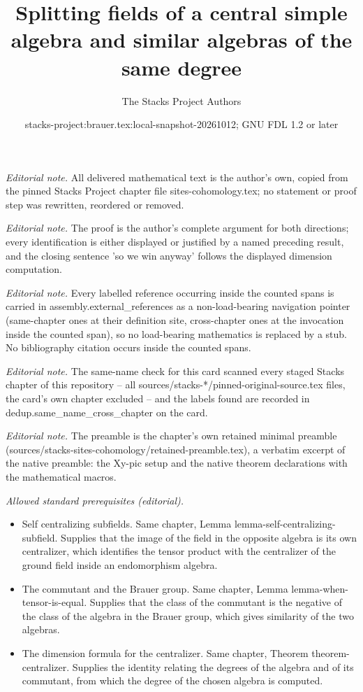 \documentclass[10pt,a4paper]{amsart}
\title{Splitting fields of a central simple algebra and similar algebras of the same degree}
\author{The Stacks Project Authors}
\date{stacks-project:brauer.tex:local-snapshot-20261012; GNU FDL 1.2 or later}
\theoremstyle{plain}
\theoremstyle{definition}
\theoremstyle{remark}
\numberwithin{equation}{subsection}
\begin{document}
\maketitle
\noindent\textit{Editorial note.} All delivered mathematical text is the author's own, copied from the pinned Stacks Project chapter file sites-cohomology.tex; no statement or proof step was rewritten, reordered or removed.\par\medskip
\noindent\textit{Editorial note.} The proof is the author's complete argument for both directions; every identification is either displayed or justified by a named preceding result, and the closing sentence 'so we win anyway' follows the displayed dimension computation.\par\medskip
\noindent\textit{Editorial note.} Every labelled reference occurring inside the counted spans is carried in assembly.external\_references as a non-load-bearing navigation pointer (same-chapter ones at their definition site, cross-chapter ones at the invocation inside the counted span), so no load-bearing mathematics is replaced by a stub. No bibliography citation occurs inside the counted spans.\par\medskip
\noindent\textit{Editorial note.} The same-name check for this card scanned every staged Stacks chapter of this repository -- all sources/stacks-*/pinned-original-source.tex files, the card's own chapter excluded -- and the labels found are recorded in dedup.same\_name\_cross\_chapter on the card.\par\medskip
\noindent\textit{Editorial note.} The preamble is the chapter's own retained minimal preamble (sources/stacks-sites-cohomology/retained-preamble.tex), a verbatim excerpt of the native preamble: the Xy-pic setup and the native theorem declarations with the mathematical macros.\par\medskip
\noindent\textit{Allowed standard prerequisites (editorial).}\begin{itemize}
\item Self centralizing subfields. Same chapter, Lemma lemma-self-centralizing-subfield. Supplies that the image of the field in the opposite algebra is its own centralizer, which identifies the tensor product with the centralizer of the ground field inside an endomorphism algebra.
\item The commutant and the Brauer group. Same chapter, Lemma lemma-when-tensor-is-equal. Supplies that the class of the commutant is the negative of the class of the algebra in the Brauer group, which gives similarity of the two algebras.
\item The dimension formula for the centralizer. Same chapter, Theorem theorem-centralizer. Supplies the identity relating the degrees of the algebra and of its commutant, from which the degree of the chosen algebra is computed.
\end{itemize}\medskip
\end{document}
